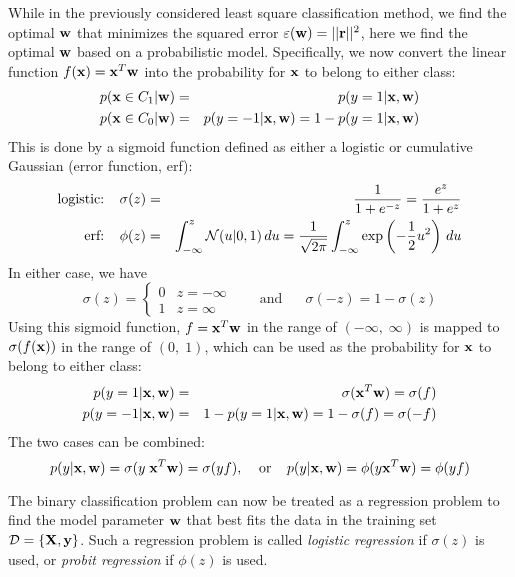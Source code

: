 \documentclass{article}
\begin{document}
While in the previously considered least square classification 
method, we find the optimal ${\bf w}$ that minimizes the squared 
error $\varepsilon({\bf w})=||{\bf r}||^2$, here we find the optimal
${\bf w}$ based on a probabilistic model. Specifically, we now 
convert the linear function $f({\bf x})={\bf x}^T{\bf w}$ into 
the probability for ${\bf x}$ to belong to either class:
\begin{eqnarray}
  p({\bf x}\in C_1|{\bf w})&=&p(y=1|{\bf x},{\bf w})
  \nonumber\\
  p({\bf x}\in C_0|{\bf w})&=&p(y=-1|{\bf x},{\bf w})
  =1-p(y=1|{\bf x},{\bf w})
\end{eqnarray}
This is done by a sigmoid function defined as either a logistic or 
cumulative Gaussian (error function, erf):
\begin{eqnarray}
  \mbox{logistic:} \;\;\;\; & \sigma(z)=&\frac{1}{1+e^{-z}}=\frac{e^z}{1+e^z}
  \nonumber\\
  \mbox{erf:} \;\;\;\; & \phi(z)=&\int_{-\infty}^z {\cal N}(u|0,1)\,du
  =\frac{1}{\sqrt{2\pi}} \int_{-\infty}^z \exp\left(-\frac{1}{2} u^2\right)\,du
  \label{sigmoid}
\end{eqnarray}
In either case, we have
\begin{equation}
  \sigma(z)=\left\{\begin{array}{ll}0 & z=-\infty\\
  1 & z=\infty\end{array}\right.
  \;\;\;\;\;\;\;\mbox{and}\;\;\;\;\;\;\sigma(-z)=1-\sigma(z)
\end{equation}
Using this sigmoid function, $f={\bf x}^T{\bf w}$ in the range of 
$(-\infty,\;\infty)$ is mapped to $\sigma(f({\bf x}))$ in the range 
of $(0,\;1)$, which can be used as the probability for ${\bf x}$ to
belong to either class:
\begin{eqnarray}
  p(y=1|{\bf x},{\bf w})&=&\sigma({\bf x}^T{\bf w})=\sigma(f)
  \nonumber\\
  p(y=-1|{\bf x},{\bf w})&=&1-p(y=1|{\bf x},{\bf w})
  =1-\sigma(f)=\sigma(-f)
\end{eqnarray}
The two cases can be combined:
\begin{equation}
  p(y|{\bf x},{\bf w})=\sigma(y\;{\bf x}^T{\bf w})=\sigma(yf),
  \;\;\;\;\mbox{or}\;\;\;\;   
  p(y|{\bf x},{\bf w})=\phi(y{\bf x}^T{\bf w})=\phi(yf)
  \label{CombinedSigmoid}
\end{equation}


The binary classification problem can now be treated as a regression 
problem to find the model parameter ${\bf w}$ that best fits the data 
in the training set ${\cal D}=\{{\bf X},{\bf y}\}$. Such a regression 
problem is called {\em logistic regression} if $\sigma(z)$ is used, or 
{\em probit regression} if $\phi(z)$ is used.
\end{document}
